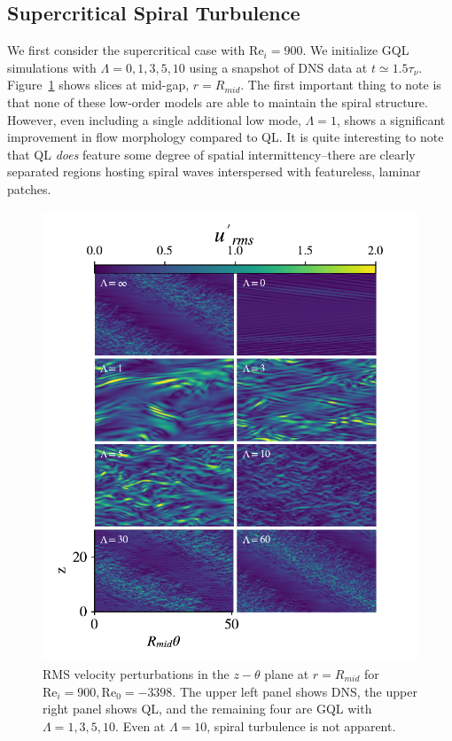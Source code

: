 \documentclass[openacc]{rstransa}%
\newcommand{\Reyn}{\mathrm{Re}}
\begin{document}
\subsection{Supercritical Spiral Turbulence}
We first consider the supercritical case with $\Reyn_i = 900$. We initialize GQL simulations with $\Lambda = 0, 1, 3, 5, 10$ using a snapshot of DNS data at $t \simeq 1.5 \tau_\nu$.  Figure~\ref{fig:rei900_snapshots} shows slices at mid-gap, $r = R_{mid}$. The first important thing to note is that none of these low-order models are able to maintain the spiral structure. However, even including a single additional low mode, $\Lambda = 1$, shows a significant improvement in flow morphology compared to QL. It is quite interesting to note that QL \emph{does} feature some degree of spatial intermittency--there are clearly separated regions hosting spiral waves interspersed with featureless, laminar patches. 
\begin{figure}
    \centering
    \includegraphics[width=\textwidth]{figs/rei900_snapshots.pdf}
    \caption{RMS velocity perturbations in the $z-\theta$ plane at $r=R_{mid}$ for $\Reyn_i=900, \Reyn_0=-3398$. The upper left panel shows DNS, the upper right panel shows QL, and the remaining four are GQL with $\Lambda = 1,3,5,10$. Even at $\Lambda = 10$, spiral turbulence is not apparent.}
    \label{fig:rei900_snapshots}
\end{figure}
\end{document}
